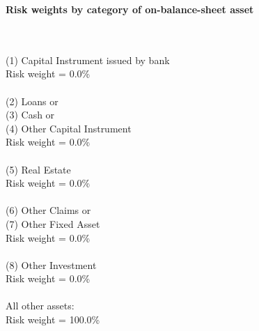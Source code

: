 \documentclass{article}
\begin{document}
\setlength{\parindent}{0em}
\begin{center}{\bf Risk weights by category of on-balance-sheet asset}\end{center}
~\\
~\\

(1) Capital Instrument issued by bank \\
Risk weight = 0.0\%\\

~\\
(2) Loans or \\
(3) Cash or \\
(4) Other Capital Instrument\\
Risk weight = 0.0\%\\

~\\
(5) Real Estate\\
Risk weight = 0.0\%\\

~\\
(6) Other Claims or \\
(7) Other Fixed Asset \\
Risk weight = 0.0\%\\

~\\
(8) Other Investment\\
Risk weight = 0.0\%\\

~\\
All other assets:\\
Risk weight = 100.0\%\\

~\\
\end{document}
